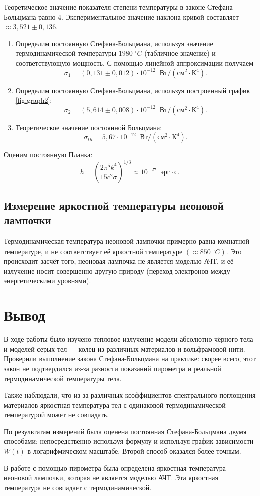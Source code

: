 \documentclass[a4paper]{article}
\begin{document}
\noindent Теоретическое значение показателя степени температуры в законе Стефана-Больцмана равно 4. Экспериментальное значение наклона кривой составляет $\approx 3,521 \pm 0,136$.

\begin{enumerate}
    \item Определим постоянную Стефана-Больцмана, используя значение термодинамической температуры $1980 \; ^\circ C$ (табличное значение) и соответствующую мощность. С помощью линейной аппроксимации получаем 
    $$\sigma_1 = (0,131 \pm 0,012) \cdot 10^{-12} \;\; \text{Вт} / (\text{см}^2\cdot\text{К}^4).$$

    \item Определим постоянную Стефана-Больцмана, используя построенный график \ref*{fig:graph2}:
    $$\sigma_2 = (5,614 \pm 0,008) \cdot 10^{-12} \;\; \text{Вт} / (\text{см}^2\cdot\text{К}^4).$$

    \item Теоретическое значение постоянной Больцмана: $$\sigma_{th} = 5,67 \cdot 10^{-12}\;\; \text{Вт} / (\text{см}^2\cdot\text{К}^4).$$
\end{enumerate}

Оценим постоянную Планка:
$$h = \left( \frac{2 \pi^5 k^4}{15 c^2 \sigma} \right)^{1/3} \approx 10^{-27} \;\; \text{эрг}\cdot\text{с}.$$

\subsection*{Измерение яркостной температуры неоновой лампочки}

Термодинамическая температура неоновой лампочки примерно равна комнатной температуре, и не соответствует её яркостной температуре $(\approx 850 \; ^\circ C)$. Это происходит засчёт того, неоновая лампочка не является моделью АЧТ, и её излучение носит совершенно другую природу (переход электронов между энергетическими уровнями).

\section{Вывод}

\noindent В ходе работы было изучено тепловое излучение модели абсолютно чёрного тела и моделей серых тел --- колец из различных материалов и вольфрамовой нити. Проверили выполнение закона Стефана-Больцмана на практике: скорее всего, этот закон не подтвердился из-за разности показаний пирометра и реальной термодинамической температуры тела. \medskip

\noindent Также наблюдали, что из-за различных коэффициентов спектрального поглощения материалов яркостная температура тел с одинаковой термодинамической температурой может не совпадать. \medskip

\noindent По результатам измерений была оценена постоянная Стефана-Больцмана двумя способами: непосредственно используя формулу и используя график зависимости $W(t)$ в логарифмическом масштабе. Второй способ оказался более точным. \medskip

\noindent В работе с помощью пирометра была определена яркостная температура неоновой лампочки, которая не является моделью АЧТ. Эта яркостная температура не совпадает с термодинамической. 
\end{document}
